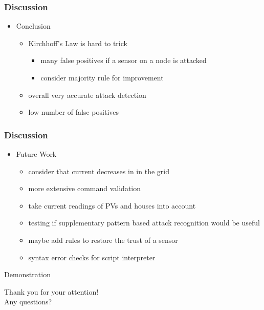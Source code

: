 \documentclass{beamer}
\begin{document}
\begin{frame}
	\frametitle{Discussion}
	\begin{itemize}
		\item Conclusion
			\begin{itemize}
				\item Kirchhoff's Law is hard to trick
					\begin{itemize}
						\item many false positives if a sensor on a node is attacked
						\item consider majority rule for improvement
					\end{itemize}
				\item overall very accurate attack detection
				\item low number of false positives
			\end{itemize}
	\end{itemize}
\end{frame}

\begin{frame}
	\frametitle{Discussion}
	\begin{itemize}
		\item Future Work
			\begin{itemize}
				\item consider that current decreases in in the grid
				\item more extensive command validation
				\item take current readings of PVs and houses into account
				\item testing if supplementary pattern based attack recognition would be useful
				\item maybe add rules to restore the trust of a sensor
				\item syntax error checks for script interpreter
			\end{itemize}
	\end{itemize}
\end{frame}

\begin{frame}
	\centering
	Demonstration
\end{frame}

\begin{frame}
	\centering
	Thank you for your attention! \\
	Any questions?
\end{frame}
\end{document}
